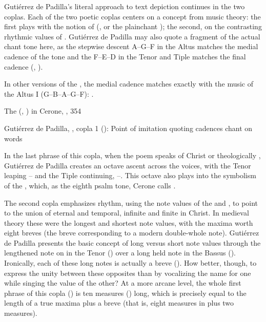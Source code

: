 Gutiérrez de Padilla's literal approach to text depiction continues in the two
coplas.
Each of the two poetic coplas centers on a concept from music theory: the first
plays with the notion of  (, or
the plainchant ); the second, on the contrasting
rhythmic values of .
Gutiérrez de Padilla may also quote a fragment of the actual chant tone here,
as the stepwise descent A--G--F in the Altus matches the medial cadence of the
tone and the F--E--D in the Tenor and Tiple matches the final cadence
(, 
).%
\begin{Footnote}
    In other versions of the , the medial cadence matches
    exactly with the music of the Altus I (G--B\fl{}--A--G--F):
    \autocite[160]{Catholic:LiberUsualis1956}.
\end{Footnote}


{The  (, ) in Cerone, , 354}

{Gutiérrez de Padilla, , copla 1
(): Point of imitation quoting cadences chant  on words }

In the last phrase of this copla, when the poem speaks of Christ  or theologically , Gutiérrez
de Padilla creates an octave ascent across the voices, with the Tenor leaping
-- and the Tiple continuing, --.
This octave also plays into the symbolism of the ,
which, as the eighth psalm tone, Cerone calls .%
    \Autocite[354]{Cerone:Melopeo}

The second copla emphasizes rhythm, using the note values of the 
and , to point to the union of eternal and temporal, infinite and
finite in Christ.
In medieval theory these were the longest and shortest note values, with the
maxima worth eight breves (the breve corresponding to a modern double-whole
note).
Gutiérrez de Padilla presents the basic concept of long versus short note
values through the lengthened note on  in the Tenor
() over a long held note in the Bassus
().
Ironically, each of these long notes is actually a breve
().
How better, though, to express the unity between these opposites than by
vocalizing the name for one while singing the value of the other?
At a more arcane level, the whole first phrase of this copla
() is ten measures () long, which is
precisely equal to the length of a true maxima plus a breve (that is, eight
measures in \meterCThree{} plus two measures).

